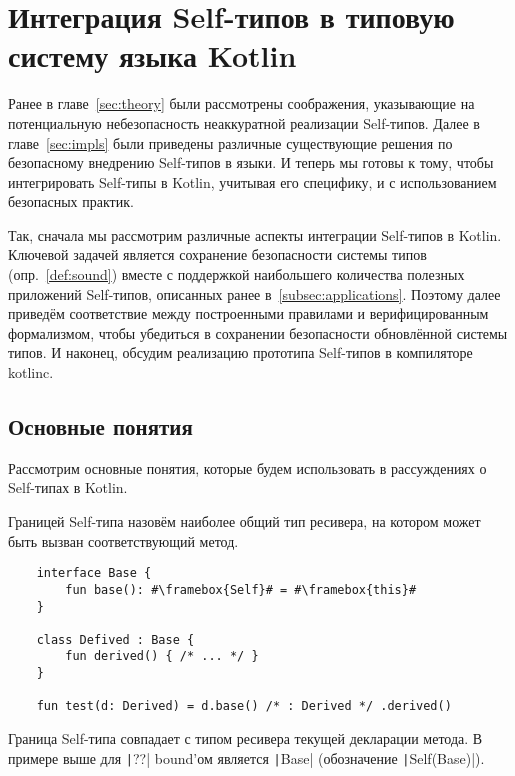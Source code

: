 \section{Интеграция Self-типов в типовую систему языка Kotlin} \label{sec:integration}

Ранее в главе~\ref{sec:theory} были рассмотрены соображения, указывающие на потенциальную небезопасность неаккуратной реализации Self-типов.
Далее в главе~\ref{sec:impls} были приведены различные существующие решения по безопасному внедрению Self-типов в языки.
И теперь мы готовы к тому, чтобы интегрировать Self-типы в Kotlin, учитывая его специфику, и с использованием безопасных практик.

Так, сначала мы рассмотрим различные аспекты интеграции Self-типов в Kotlin.
Ключевой задачей является сохранение безопасности системы типов (опр.~\ref{def:sound}) вместе с поддержкой наибольшего количества полезных приложений Self-типов, описанных ранее в~\ref{subsec:applications}.
Поэтому далее приведём соответствие между построенными правилами и верифицированным формализмом, чтобы убедиться в сохранении безопасности обновлённой системы типов.
И наконец, обсудим реализацию прототипа Self-типов в компиляторе kotlinc.


\subsection{Основные понятия}

Рассмотрим основные понятия, которые будем использовать в рассуждениях о Self-типах в Kotlin.

\begin{definition}
    \label{def:bound}
    Границей Self-типа назовём наиболее общий тип ресивера, на котором может быть вызван соответствующий метод.
\end{definition}

\begin{verbatim}
    interface Base {
        fun base(): #\framebox{Self}# = #\framebox{this}#
    }

    class Defived : Base {
        fun derived() { /* ... */ }
    }

    fun test(d: Derived) = d.base() /* : Derived */ .derived()
\end{verbatim}

Граница Self-типа совпадает с типом ресивера текущей декларации метода.
В примере выше для \texttt|??| bound'ом является \texttt|Base| (обозначение \texttt|Self(Base)|).

